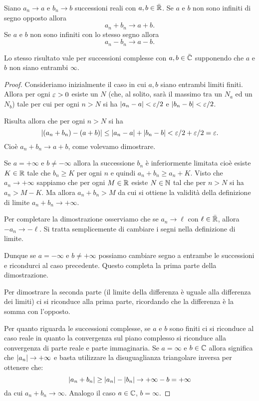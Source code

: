 \begin{theorem}
\label{th:limite_somma}
\mymark{***}
Siano $a_n \to a$ e $b_n \to b$ successioni reali con $a,b\in \bar {\mathbb R}$.
Se $a$ e $b$ non sono
infiniti di segno opposto
allora
\[
    a_n + b_n \to a+b.
\]
Se $a$ e $b$ non sono infiniti con lo stesso segno allora
\[
   a_n - b_n \to a-b.
\]

Lo stesso risultato vale per successioni complesse con $a,b\in \bar {\mathbb C}$
supponendo che $a$ e $b$ non siano entrambi $\infty$.
\end{theorem}
%
\begin{proof}
\mymark{**}
Consideriamo inizialmente il caso in cui $a,b$ siano entrambi limiti finiti.
Allora per ogni $\varepsilon>0$ esiste un $N$ (che, al solito, sarà il massimo tra un $N_a$ ed un $N_b$) tale per cui per ogni $n> N$ si ha
${\left|a_n -a\right|} < \varepsilon/2$ e ${\left|b_n - b\right|} < \varepsilon/2$.

Risulta allora che per ogni $n> N$ si ha
\[
  {\left|(a_n + b_n) - (a+b)\right|} \le {\left|a_n -a\right|} + {\left|b_n -b\right|} < \varepsilon/2 + \varepsilon/2 = \varepsilon.
\]
Cioè $a_n+b_n \to a+b$, come volevamo dimostrare.

Se $a =+\infty$ e $b\neq -\infty$ allora la successione $b_n$ è inferiormente
limitata cioè esiste $K\in \mathbb R$ tale che $b_n \ge K$ per ogni $n$ e quindi
$a_n+b_n \ge a_n + K$.
Visto che $a_n \to +\infty$ sappiamo che per ogni $M\in \mathbb R$ esiste
$N\in \mathbb N$ tal che per $n>N$ si ha $a_n > M - K$.
Ma allora $a_n + b_n >M$ da cui si ottiene la validità della definizione
di limite $a_n + b_n \to +\infty$.

Per completare la dimostrazione osserviamo che se $a_n\to \ell$ con $\ell \in
\bar {\mathbb R}$, allora $-a_n \to -\ell$. Si tratta semplicemente di cambiare i segni
nella definizione di limite.

Dunque se $a=-\infty$ e $b\neq +\infty$ possiamo cambiare segno a entrambe
le successioni e ricondurci al caso precedente. Questo completa la prima
parte della dimostrazione.

Per dimostrare la seconda parte (il limite della differenza è uguale alla differenza dei limiti) ci si riconduce alla prima parte, ricordando che la
differenza è la somma con l'opposto.

Per quanto riguarda le successioni complesse, se $a$ e $b$ sono finiti ci si
riconduce al caso reale in quanto la convergenza sul piano complesso si riconduce
alla convergenza di parte reale e parte immaginaria.
Se $a=\infty$ e $b\in \mathbb C$ allora significa che ${\left|a_n\right|}\to +\infty$ e
basta
utilizzare la disuguaglianza triangolare inversa per ottenere che:
\[
  {\left|a_n+b_n\right|} \ge {\left|a_n\right|} - {\left|b_n\right|} \to +\infty - b = +\infty
\]
da cui $a_n+b_n\to \infty$. Analogo il caso $a\in \mathbb C$, $b=\infty$.
\end{proof}

